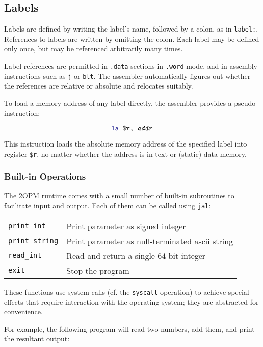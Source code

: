 \documentclass{article}
\begin{document}
\subsection{Labels}

Labels are defined by writing the label's name, followed by a colon, as in \texttt{label:}.
References to labels are written by omitting the colon.  Each label may be defined only once,
but may be referenced arbitrarily many times.

Label references are permitted in \texttt{.data} sections in \texttt{.word} mode, and in
assembly instructions such as \texttt{\textcolor{dblue}{j}} or \texttt{\textcolor{dblue}{blt}}.  The
assembler automatically figures out whether the references are relative or absolute and relocates suitably.

To load a memory address of any label directly, the assembler provides a pseudo-instruction:

\[
\texttt{\textcolor{dblue}{la} \texttt{\$r}, \texttt{\textit{addr}}}
\]

This instruction loads the absolute memory address of the specified label into register \texttt{\$r},
no matter whether the address is in text or (static) data memory.


\subsubsection{Built-in Operations}
The 2OPM runtime comes with a small number of built-in subroutines to facilitate
input and output.  Each of them can be called using
\texttt{\textcolor{dblue}{jal}}:

\begin{tabular}{ll}
\texttt{print\_int} & Print parameter as signed integer \\
\texttt{print\_string} & Print parameter as null-terminated ascii string \\
\texttt{read\_int} & Read and return a single 64 bit integer \\
\texttt{exit} & Stop the program \\
\end{tabular}

These functions use system calls (cf. the
\texttt{\textcolor{dblue}{syscall}} operation) to achieve special
effects that require interaction with the operating system; they are
abstracted for convenience.


For example, the following program will read two numbers, add them,
and print the resultant output:
\end{document}
